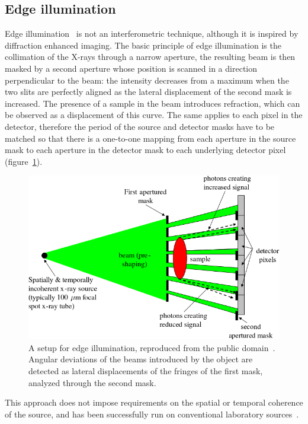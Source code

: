 \subsection{Edge illumination}
Edge illumination~\parencite{Olivo2001} is not an interferometric technique, although it is
inspired by diffraction enhanced imaging. The basic principle of edge
illumination is the collimation of the X-rays through a narrow aperture,
the resulting beam is then masked by a second aperture whose position is
scanned in a direction perpendicular to the beam: the intensity decreases from a
maximum when the two slits are perfectly aligned as the lateral displacement
of the second mask is increased.
The presence of a sample in the beam introduces refraction, which can be
observed as a displacement of this curve. The same applies to each pixel in
the detector, therefore the period of the source and detector masks have to
be matched so that there is a one-to-one mapping from each aperture in the
source mask to each aperture in the detector mask to each underlying
detector pixel (figure~\ref{fig:edge-illumination}).

\begin{figure}[htb]
    \centering
    \includegraphics[width=.8\textwidth]{gfx/edgeillumination.png}
    \caption[Edge illumination.]{A setup for edge illumination, reproduced
        from the public domain~\parencite{edge-illumination-picture}. Angular
        deviations of the beams introduced by the object are detected as
        lateral displacements of the fringes of the first mask, analyzed
        through the second mask.}
    \label{fig:edge-illumination}
\end{figure}

This approach does not impose requirements on the spatial or temporal
coherence of the source, and has been successfully run on conventional
laboratory sources~\parencite{Olivo2007}.

